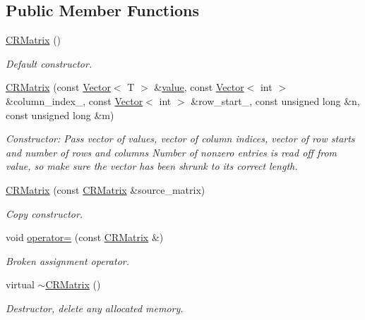 \subsection*{Public Member Functions}
\begin{DoxyCompactItemize}
\item 
\hyperlink{classoomph_1_1CRMatrix_a0b362175c2474a0531ed7b196681209b}{C\+R\+Matrix} ()
\begin{DoxyCompactList}\small\item\em Default constructor. \end{DoxyCompactList}\item 
\hyperlink{classoomph_1_1CRMatrix_afefb2869fd01835cd23a8db25b90148f}{C\+R\+Matrix} (const \hyperlink{classoomph_1_1Vector}{Vector}$<$ T $>$ \&\hyperlink{classoomph_1_1SparseMatrix_a3e382ff145082821a6b0b3e63b6aed5d}{value}, const \hyperlink{classoomph_1_1Vector}{Vector}$<$ int $>$ \&column\+\_\+index\+\_\+, const \hyperlink{classoomph_1_1Vector}{Vector}$<$ int $>$ \&row\+\_\+start\+\_\+, const unsigned long \&n, const unsigned long \&m)
\begin{DoxyCompactList}\small\item\em Constructor\+: Pass vector of values, vector of column indices, vector of row starts and number of rows and columns Number of nonzero entries is read off from value, so make sure the vector has been shrunk to its correct length. \end{DoxyCompactList}\item 
\hyperlink{classoomph_1_1CRMatrix_a27b5182b560fd414bde62baf6fe7f519}{C\+R\+Matrix} (const \hyperlink{classoomph_1_1CRMatrix}{C\+R\+Matrix} \&source\+\_\+matrix)
\begin{DoxyCompactList}\small\item\em Copy constructor. \end{DoxyCompactList}\item 
void \hyperlink{classoomph_1_1CRMatrix_ae18692a9988d3635990b1c67a303b6fd}{operator=} (const \hyperlink{classoomph_1_1CRMatrix}{C\+R\+Matrix} \&)
\begin{DoxyCompactList}\small\item\em Broken assignment operator. \end{DoxyCompactList}\item 
virtual \hyperlink{classoomph_1_1CRMatrix_ae0f73d8120305af7a20f6f7b64af0547}{$\sim$\+C\+R\+Matrix} ()
\begin{DoxyCompactList}\small\item\em Destructor, delete any allocated memory. \end{DoxyCompactList}\item 

\end{DoxyCompactItemize}
